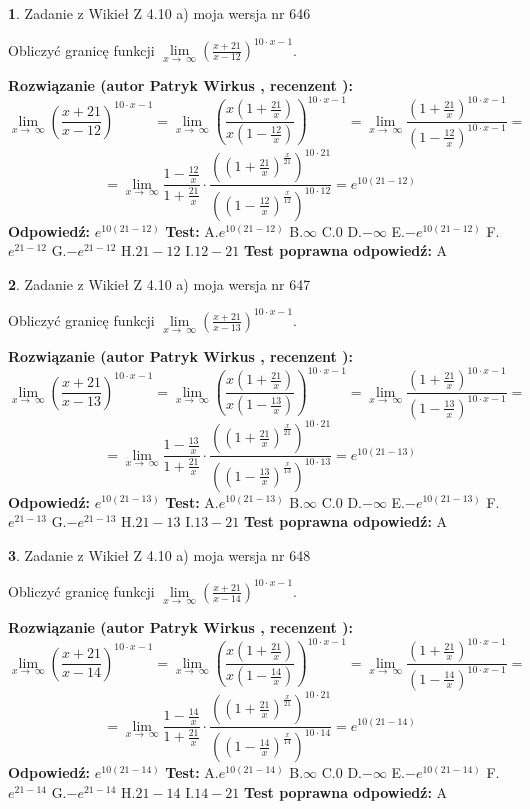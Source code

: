 \documentclass[12pt, a4paper]{article}
\theoremstyle{definition} %
\newtheorem{zad}{}
\newcommand{\zadStart}[1]{\begin{zad}#1\newline}
\newcommand{\zadStop}{\end{zad}}
\newcommand{\rozwStart}[2]{\noindent \textbf{Rozwiązanie (autor #1 , recenzent #2): }\newline}
\newcommand{\rozwStop}{\newline}
\newcommand{\odpStart}{\noindent \textbf{Odpowiedź:}\newline}
\newcommand{\odpStop}{\newline}
\newcommand{\testStart}{\noindent \textbf{Test:}\newline}
\newcommand{\testStop}{\newline}
\newcommand{\kluczStart}{\noindent \textbf{Test poprawna odpowiedź:}\newline}
\newcommand{\kluczStop}{\newline}
\begin{document}
\zadStart{Zadanie z Wikieł Z 4.10 a) moja wersja nr 646}


Obliczyć granicę funkcji  $\lim\limits_{x\to\ \infty}(\frac{x+21}{x-12})^{10\cdot x-1}$.
\zadStop
\rozwStart{Patryk Wirkus}{}
$$\lim\limits_{x\to\ \infty}(\frac{x+21}{x-12})^{10\cdot x-1} = \lim\limits_{x\to\ \infty}(\frac{x(1+\frac{21}{x})}{x(1-\frac{12}{x})})^{10\cdot x-1}=\lim\limits_{x\to\ \infty}\frac{(1+\frac{21}{x})^{10\cdot x-1}}{(1-\frac{12}{x})^{10\cdot x-1}}=$$
$$=\lim\limits_{x\to\ \infty}\frac{1-\frac{12}{x}}{1+\frac{21}{x}}\cdot\frac{((1+\frac{21}{x})^{\frac{x}{21}})^{10\cdot21}}{((1-\frac{12}{x})^{\frac{x}{12}})^{10\cdot12}}=e^{10(21-12)}$$
\rozwStop
\odpStart
$e^{10(21-12)}$
\odpStop
\testStart
A.$e^{10(21-12)}$ B.$\infty$ C.$0$ D.$-\infty$ E.$-e^{10(21-12)}$
F.$e^{21-12}$ G.$-e^{21-12}$
H.$21-12$
I.$12-21$
\testStop
\kluczStart
A
\kluczStop



\zadStart{Zadanie z Wikieł Z 4.10 a) moja wersja nr 647}


Obliczyć granicę funkcji  $\lim\limits_{x\to\ \infty}(\frac{x+21}{x-13})^{10\cdot x-1}$.
\zadStop
\rozwStart{Patryk Wirkus}{}
$$\lim\limits_{x\to\ \infty}(\frac{x+21}{x-13})^{10\cdot x-1} = \lim\limits_{x\to\ \infty}(\frac{x(1+\frac{21}{x})}{x(1-\frac{13}{x})})^{10\cdot x-1}=\lim\limits_{x\to\ \infty}\frac{(1+\frac{21}{x})^{10\cdot x-1}}{(1-\frac{13}{x})^{10\cdot x-1}}=$$
$$=\lim\limits_{x\to\ \infty}\frac{1-\frac{13}{x}}{1+\frac{21}{x}}\cdot\frac{((1+\frac{21}{x})^{\frac{x}{21}})^{10\cdot21}}{((1-\frac{13}{x})^{\frac{x}{13}})^{10\cdot13}}=e^{10(21-13)}$$
\rozwStop
\odpStart
$e^{10(21-13)}$
\odpStop
\testStart
A.$e^{10(21-13)}$ B.$\infty$ C.$0$ D.$-\infty$ E.$-e^{10(21-13)}$
F.$e^{21-13}$ G.$-e^{21-13}$
H.$21-13$
I.$13-21$
\testStop
\kluczStart
A
\kluczStop



\zadStart{Zadanie z Wikieł Z 4.10 a) moja wersja nr 648}


Obliczyć granicę funkcji  $\lim\limits_{x\to\ \infty}(\frac{x+21}{x-14})^{10\cdot x-1}$.
\zadStop
\rozwStart{Patryk Wirkus}{}
$$\lim\limits_{x\to\ \infty}(\frac{x+21}{x-14})^{10\cdot x-1} = \lim\limits_{x\to\ \infty}(\frac{x(1+\frac{21}{x})}{x(1-\frac{14}{x})})^{10\cdot x-1}=\lim\limits_{x\to\ \infty}\frac{(1+\frac{21}{x})^{10\cdot x-1}}{(1-\frac{14}{x})^{10\cdot x-1}}=$$
$$=\lim\limits_{x\to\ \infty}\frac{1-\frac{14}{x}}{1+\frac{21}{x}}\cdot\frac{((1+\frac{21}{x})^{\frac{x}{21}})^{10\cdot21}}{((1-\frac{14}{x})^{\frac{x}{14}})^{10\cdot14}}=e^{10(21-14)}$$
\rozwStop
\odpStart
$e^{10(21-14)}$
\odpStop
\testStart
A.$e^{10(21-14)}$ B.$\infty$ C.$0$ D.$-\infty$ E.$-e^{10(21-14)}$
F.$e^{21-14}$ G.$-e^{21-14}$
H.$21-14$
I.$14-21$
\testStop
\kluczStart
A
\kluczStop
\end{document}
